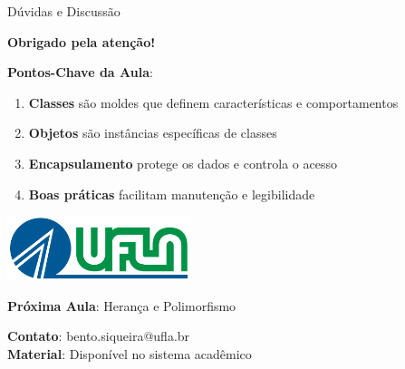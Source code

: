 \documentclass[aspectratio=169]{beamer}
\begin{document}
\begin{frame}{Dúvidas e Discussão}
\begin{center}
\textbf{Obrigado pela atenção!}
\end{center}

\textbf{Pontos-Chave da Aula}:
\begin{enumerate}
\item \textbf{Classes} são moldes que definem características e comportamentos
\item \textbf{Objetos} são instâncias específicas de classes
\item \textbf{Encapsulamento} protege os dados e controla o acesso
\item \textbf{Boas práticas} facilitam manutenção e legibilidade
\end{enumerate}

\vspace{0.5cm}
\begin{center}
\includegraphics[width=0.4\textwidth]{../../Image/ufla-logo.PNG}
\end{center}

\vspace{0.3cm}
\textbf{Próxima Aula}: Herança e Polimorfismo

\vspace{0.3cm}
\textbf{Contato}: bento.siqueira@ufla.br\\
\textbf{Material}: Disponível no sistema acadêmico
\end{frame}
\end{document}
